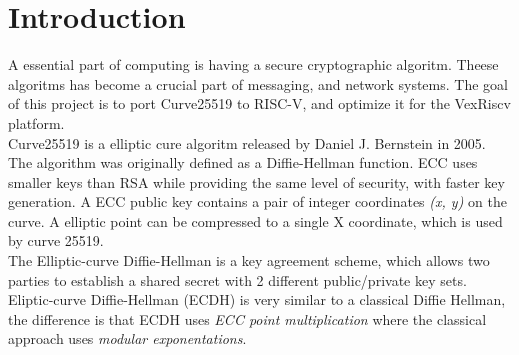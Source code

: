 \section{Introduction}
A essential part of computing is having a secure cryptographic algoritm. Theese algoritms has become a crucial part of messaging, and network systems.
The goal of this project is to port Curve25519 to RISC-V, and optimize it for the VexRiscv platform.
\\
Curve25519 is a elliptic cure algoritm released by Daniel J. Bernstein in 2005. The algorithm was originally defined as a Diffie-Hellman function.
ECC uses smaller keys than RSA while providing the same level of security, with faster key generation.
A ECC public key contains a pair of integer coordinates \textit{(x, y)} on the curve. A elliptic point can be compressed to a single X coordinate, which is used by curve 25519.
\\
The Elliptic-curve Diffie-Hellman is a key agreement scheme, which allows two parties to establish a shared secret with 2 different public/private key sets. 
Eliptic-curve Diffie-Hellman (ECDH) is very similar to a classical Diffie Hellman, the difference is that ECDH uses \textit{ECC point multiplication} where the classical approach uses \textit{modular exponentations}.
\pagebreak